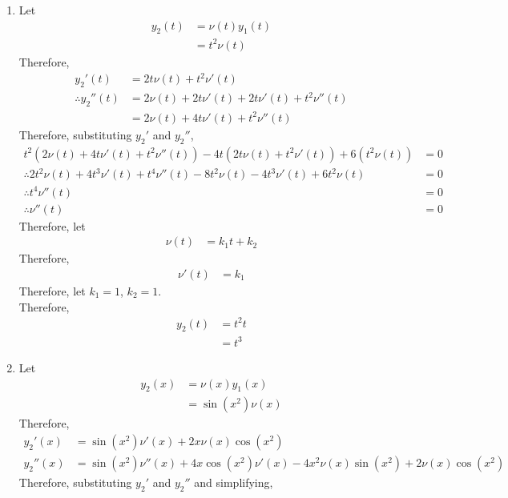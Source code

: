 \documentclass[fleqn, a4paper, 11pt, oneside]{amsart}
\theoremstyle{definition}
\theoremstyle{theorem}
\begin{document}
\begin{solution}
	\begin{enumerate}[leftmargin = *]
		\item
			Let
			\begin{align*}
				y_2(t) &= \nu(t) y_1(t)\\
				&= t^2 \nu(t)
			\end{align*}
			Therefore,
			\begin{align*}
				{y_2}'(t) &= 2 t \nu(t) + t^2 \nu'(t)\\
				\therefore {y_2}''(t) &= 2 \nu(t) + 2 t \nu'(t) + 2 t \nu'(t) + t^2 \nu''(t)\\
				&= 2 \nu(t) + 4 t \nu'(t) + t^2 \nu''(t)
			\end{align*}
			Therefore, substituting ${y_2}'$ and ${y_2}''$,
			\begin{align*}
				t^2 \left( 2 \nu(t) + 4 t \nu'(t) + t^2 \nu''(t) \right) - 4 t \left( 2 t \nu(t) + t^2 \nu'(t) \right) + 6 \left( t^2 \nu(t) \right) &= 0\\
				\therefore 2 t^2 \nu(t) + 4 t^3 \nu'(t) + t^4 \nu''(t) - 8 t^2 \nu(t) - 4 t^3 \nu'(t) + 6 t^2 \nu(t) &= 0\\
				\therefore t^4 \nu''(t) &= 0\\
				\therefore \nu''(t) &= 0
			\end{align*}
			Therefore, let
			\begin{align*}
				\nu(t) &= k_1 t + k_2
			\end{align*}
			Therefore,
			\begin{align*}
				\nu'(t) &= k_1
			\end{align*}
			Therefore, let $k_1 = 1$, $k_2 = 1$.\\
			Therefore,
			\begin{align*}
				y_2(t) &= t^2 t\\
				&= t^3
			\end{align*}
		\item
			Let
			\begin{align*}
				y_2(x) &= \nu(x) y_1(x)\\
				&= \sin(x^2) \nu(x)
			\end{align*}
			Therefore,
			\begin{align*}
				{y_2}'(x) &= \sin(x^2) \nu'(x) + 2 x \nu(x) \cos(x^2)\\
				{y_2}''(x) &= \sin(x^2) \nu''(x) + 4 x \cos(x^2) \nu'(x) - 4 x^2 \nu(x) \sin(x^2) + 2 \nu(x) \cos(x^2)
			\end{align*}
			Therefore, substituting ${y_2}'$ and ${y_2}''$ and simplifying,

\end{enumerate}
\end{solution}
\end{document}
